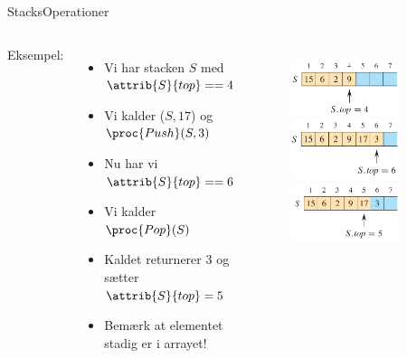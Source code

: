 \documentclass[aspectratio=1610]{beamer}
\begin{document}
\begin{frame}{Stacks}{Operationer}
\begin{columns}

        Eksempel:

        \begin{itemize}
            \small
            \item Vi har stacken $S$ med $\attrib{S}{top} == 4$
            \item Vi kalder ($S, 17$) og $\proc{Push}(S,3)$
            \item Nu har vi $\attrib{S}{top} == 6$
            \item Vi kalder $\proc{Pop}(S)$
            \item Kaldet returnerer 3 og sætter $\attrib{S}{top} = 5$
            \item Bemærk at \alert{elementet stadig er i arrayet!}
        \end{itemize}

        \begin{figure}[h]
            \centering
            \includegraphics[width=0.8\textwidth]{stack-example/stack-a}
            \includegraphics[width=0.8\textwidth]{stack-example/stack-b}
            \includegraphics[width=0.8\textwidth]{stack-example/stack-c}
        \end{figure}

    \end{columns}
\end{frame}
\end{document}
